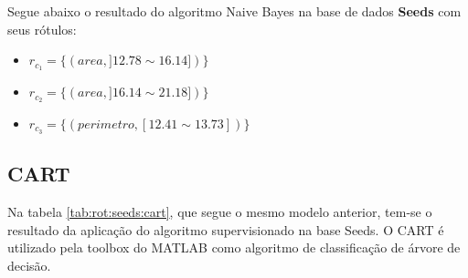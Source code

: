 %  





Segue abaixo o resultado do algoritmo Naive Bayes na base de dados \textbf{Seeds} com seus rótulos: 
\begin{itemize}[noitemsep]
 \item ${r_{c_1}=\{ (area, ]12.78 \sim 16.14]) \} }$  
 \item ${r_{c_2}=\{ (area, ]16.14 \sim 21.18]) \} }$
 \item ${r_{c_3}=\{ (perimetro, [12.41 \sim 13.73])\} }$
\end{itemize}


\subsection{CART}\label{cap:resultados:ssec:seed:cart}

Na tabela \ref{tab:rot:seeds:cart}, que segue o mesmo modelo anterior, tem-se o resultado da aplicação do algoritmo supervisionado na base Seeds. O CART é utilizado pela toolbox do MATLAB como algoritmo de classificação de árvore de decisão. 

